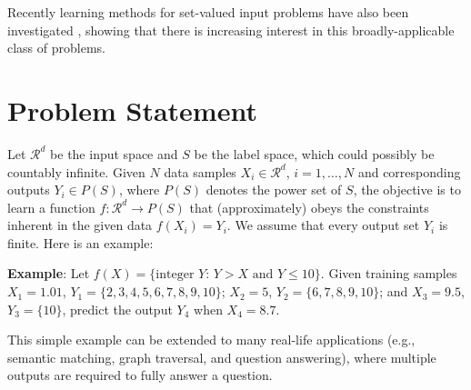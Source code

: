 \documentclass[letterpaper]{article} %
\begin{document}
Recently learning methods for set-valued input problems have also been investigated \cite{zaheer2017deep}, showing that there is increasing interest in this broadly-applicable class of problems.


\section{Problem Statement}

Let $\mathcal{R}^d$ be the input space and $S$ be the label space, which could possibly be countably infinite. Given $N$ data samples $X_i \in \mathcal{R}^d$, $i = 1, \ldots, N$ and corresponding outputs $Y_i \in P(S)$, where $P(S)$ denotes the power set of $S$, the objective is to learn a function $f: \mathcal{R}^d \to P(S)$ that (approximately) obeys the constraints inherent in the given data $f(X_i)=Y_i$. We assume that every output set $Y_i$ is finite. Here is an example:

\textbf{Example}: Let $f(X)=\{ \text{integer } Y : \, Y > X \text{ and } Y \le 10\}$. Given training samples $X_1=1.01$, $Y_1=\{2,3,4,5,6,7,8,9,10\}$; $X_2=5$, $Y_2=\{6,7,8,9,10\}$; and $X_3=9.5$, $Y_3=\{10\}$, predict the output $Y_4$ when $X_4=8.7$.




This simple example can be extended to many real-life applications (e.g., semantic matching, graph traversal, and question answering), where multiple outputs are required to fully answer a question.
\end{document}
